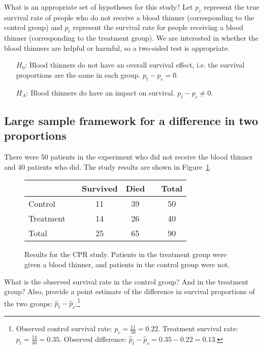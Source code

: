 \begin{example}{What is an appropriate set of hypotheses for this study? Let $p_c$ represent the true survival rate of people who do not receive a blood thinner (corresponding to the control group) and $p_t$ represent the survival rate for people receiving a blood thinner (corresponding to the treatment group).} \label{hypothesesForCPRStudyInSmallSampleSection}
We are interested in whether the blood thinners are helpful or harmful, so a two-sided test is appropriate.
\begin{itemize}
\item[$H_0$:] Blood thinners do not have an overall survival effect, i.e. the survival proportions are the same in each group. $p_t - p_c = 0$.
\item[$H_A$:] Blood thinners do have an impact on survival. $p_t - p_c \neq 0$.
\end{itemize}
\end{example}

\subsection{Large sample framework for a difference in two proportions}

There were 50 patients in the experiment who did not receive the blood thinner and 40 patients who did. The study results are shown in Figure~\ref{resultsForCPRStudyInSmallSampleSection}.

\begin{figure}[ht]
\centering
\begin{tabular}{lccccc}
\hline
			&& Survived 	& Died 	&& Total \\
\hline
Control		&& 11		& 39		&& 50 \\
Treatment		&& 14		& 26		&& 40 \\
\hline
Total			&& 25		& 65		&& 90 \\
\hline
\end{tabular}
\caption{Results for the CPR study. Patients in the treatment group were given a blood thinner, and patients in the control group were not.}
\label{resultsForCPRStudyInSmallSampleSection}
\end{figure}

\begin{exercise}
What is the observed survival rate in the control group? And in the treatment group? Also, provide a point estimate of the difference in survival proportions of the two groups: $\hat{p}_t - \hat{p}_c$.\footnote{Observed control survival rate: $p_c = \frac{11}{50} = 0.22$. Treatment survival rate: $p_t = \frac{14}{40} = 0.35$. Observed difference: $\hat{p}_t - \hat{p}_c = 0.35 - 0.22 = 0.13$.}
\end{exercise}

